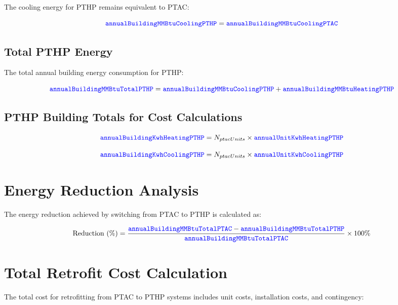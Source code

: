 \documentclass{article}
\newcommand{\code}[1]{\textcolor{blue}{\texttt{#1}}}
\begin{document}
The cooling energy for PTHP remains equivalent to PTAC:

\begin{equation}
\code{annualBuildingMMBtuCoolingPTHP} = \code{annualBuildingMMBtuCoolingPTAC}
\end{equation}

\subsection{Total PTHP Energy}

The total annual building energy consumption for PTHP:

\begin{equation}
\code{annualBuildingMMBtuTotalPTHP} = \code{annualBuildingMMBtuCoolingPTHP} + \code{annualBuildingMMBtuHeatingPTHP}
\end{equation}

\subsection{PTHP Building Totals for Cost Calculations}

\begin{equation}
\code{annualBuildingKwhHeatingPTHP} = N_{ptacUnits} \times \code{annualUnitKwhHeatingPTHP}
\end{equation}

\begin{equation}
\code{annualBuildingKwhCoolingPTHP} = N_{ptacUnits} \times \code{annualUnitKwhCoolingPTHP}
\end{equation}

\section{Energy Reduction Analysis}

The energy reduction achieved by switching from PTAC to PTHP is calculated as:

\begin{equation}
\text{Reduction (\%)} = \frac{\code{annualBuildingMMBtuTotalPTAC} - \code{annualBuildingMMBtuTotalPTHP}}{\code{annualBuildingMMBtuTotalPTAC}} \times 100\%
\end{equation}

\section{Total Retrofit Cost Calculation}

The total cost for retrofitting from PTAC to PTHP systems includes unit costs, installation costs, and contingency:
\end{document}
